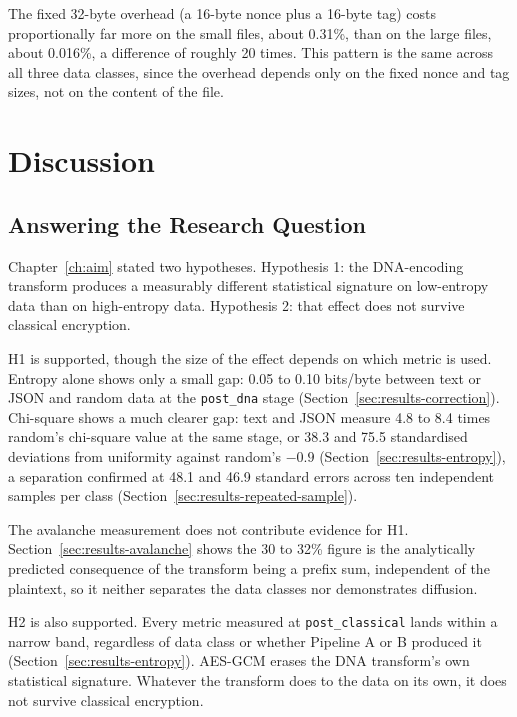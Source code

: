 \documentclass[12pt,a4paper,twoside]{report}
\numberwithin{equation}{chapter}
\begin{document}
The fixed 32-byte overhead (a 16-byte nonce plus a 16-byte tag) costs
proportionally far more on the small files, about 0.31\%, than on the
large files, about 0.016\%, a difference of roughly 20 times. This
pattern is the same across all three data classes, since the overhead
depends only on the fixed nonce and tag sizes, not on the content of
the file.

\chapter{Discussion}
\label{ch:discussion}

\section{Answering the Research Question}
Chapter~\ref{ch:aim} stated two hypotheses. Hypothesis 1: the DNA-encoding
transform produces a measurably different statistical signature on
low-entropy data than on high-entropy data. Hypothesis 2: that effect does not
survive classical encryption.

H1 is supported, though the size of the effect depends on which metric
is used. Entropy alone shows only a small gap:
0.05 to 0.10 bits/byte between text or JSON and random data at the
\texttt{post\_dna} stage (Section~\ref{sec:results-correction}).
Chi-square shows a much clearer gap: text and JSON measure 4.8 to 8.4
times random's chi-square value at the same stage, or 38.3 and 75.5
standardised deviations from uniformity against random's $-0.9$
(Section~\ref{sec:results-entropy}), a separation confirmed at 48.1 and
46.9 standard errors across ten independent samples per class
(Section~\ref{sec:results-repeated-sample}).

The avalanche measurement does not contribute evidence for H1.
Section~\ref{sec:results-avalanche} shows the 30 to 32\% figure is the
analytically predicted consequence of the transform being a prefix sum,
independent of the plaintext, so it neither separates the data classes
nor demonstrates diffusion.

H2 is also supported. Every metric measured
at \texttt{post\_classical} lands within a narrow band, regardless of
data class or whether Pipeline A or B produced it
(Section~\ref{sec:results-entropy}). AES-GCM erases the DNA transform's
own statistical signature. Whatever the transform does to the data on
its own, it does not survive classical encryption.
\end{document}
